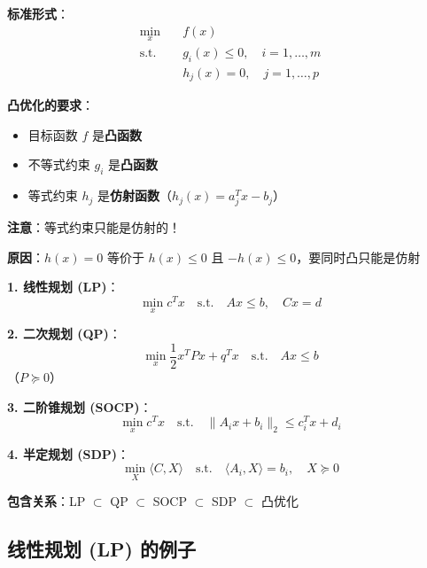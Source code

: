 \documentclass[12pt, a4paper]{ctexart}
\begin{document}
\begin{blackboard}[凸优化的标准形式]

\textbf{标准形式}：
\[
\begin{aligned}
\min_{x} \quad & f(x) \\
\text{s.t.} \quad & g_i(x) \leq 0, \quad i = 1, \ldots, m \\
& h_j(x) = 0, \quad j = 1, \ldots, p
\end{aligned}
\]

\textbf{凸优化的要求}：
\begin{itemize}
    \item 目标函数 $f$ 是\textbf{凸函数}
    \item 不等式约束 $g_i$ 是\textbf{凸函数}
    \item 等式约束 $h_j$ 是\textbf{仿射函数}（$h_j(x) = a_j^T x - b_j$）
\end{itemize}

\textbf{注意}：等式约束只能是仿射的！

\textbf{原因}：$h(x) = 0$ 等价于 $h(x) \leq 0$ 且 $-h(x) \leq 0$，要同时凸只能是仿射

\end{blackboard}

\begin{blackboard}[常见的凸优化问题]

\textbf{1. 线性规划 (LP)}：
\[
\min_x c^T x \quad \text{s.t.} \quad Ax \leq b, \quad Cx = d
\]

\textbf{2. 二次规划 (QP)}：
\[
\min_x \frac{1}{2} x^T P x + q^T x \quad \text{s.t.} \quad Ax \leq b
\]
（$P \succeq 0$）

\textbf{3. 二阶锥规划 (SOCP)}：
\[
\min_x c^T x \quad \text{s.t.} \quad \|A_i x + b_i\|_2 \leq c_i^T x + d_i
\]

\textbf{4. 半定规划 (SDP)}：
\[
\min_X \langle C, X \rangle \quad \text{s.t.} \quad \langle A_i, X \rangle = b_i, \quad X \succeq 0
\]

\textbf{包含关系}：LP $\subset$ QP $\subset$ SOCP $\subset$ SDP $\subset$ 凸优化

\end{blackboard}

\subsection{线性规划 (LP) 的例子}
\end{document}
